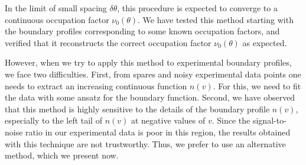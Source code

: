 In the limit of small spacing $\delta \theta$, this procedure is expected to converge to a continuous occupation factor $\nu_0(\theta)$. We have tested this method starting with the boundary profiles corresponding to some known occupation factors, and verified that it reconstructs the correct occupation factor $\nu_0(\theta)$ as expected.


However, when we try to apply this method to experimental boundary profiles, we face two difficulties. First, from spares  and noisy experimental data points one needs to extract an increasing continuous function $n(v)$. For this, we need to fit the data with some ansatz for the boundary function. Second, we have observed that this method is highly sensitive to the details of the boundary profile $n(v)$, especially to the left tail of $n(v)$ at negative values of $v$. Since the signal-to-noise ratio in our experimental data is poor in this region, the results obtained with this technique are not trustworthy. Thus, we prefer to use an alternative method, which we present now.





